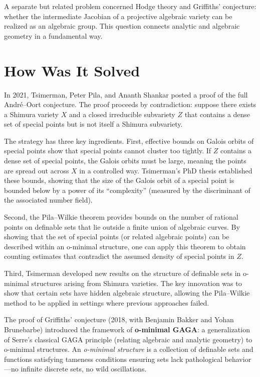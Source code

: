 A separate but related problem concerned Hodge theory and Griffiths' conjecture: whether the intermediate Jacobian of a projective algebraic variety can be realized as an algebraic group. This question connects analytic and algebraic geometry in a fundamental way.

\section{How Was It Solved}

In 2021, Tsimerman, Peter Pila, and Ananth Shankar posted a proof of the full Andr\'{e}--Oort conjecture. The proof proceeds by contradiction: suppose there exists a Shimura variety $X$ and a closed irreducible subvariety $Z$ that contains a dense set of special points but is not itself a Shimura subvariety.

The strategy has three key ingredients. First, effective bounds on Galois orbits of special points show that special points cannot cluster too tightly. If $Z$ contains a dense set of special points, the Galois orbits must be large, meaning the points are spread out across $X$ in a controlled way. Tsimerman's PhD thesis established these bounds, showing that the size of the Galois orbit of a special point is bounded below by a power of its ``complexity'' (measured by the discriminant of the associated number field).

Second, the Pila--Wilkie theorem provides bounds on the number of rational points on definable sets that lie outside a finite union of algebraic curves. By showing that the set of special points (or related algebraic points) can be described within an o-minimal structure, one can apply this theorem to obtain counting estimates that contradict the assumed density of special points in $Z$.

Third, Tsimerman developed new results on the structure of definable sets in o-minimal structures arising from Shimura varieties. The key innovation was to show that certain sets have hidden algebraic structure, allowing the Pila--Wilkie method to be applied in settings where previous approaches failed.

The proof of Griffiths' conjecture (2018, with Benjamin Bakker and Yohan Brunebarbe) introduced the framework of \textbf{o-minimal GAGA}: a generalization of Serre's classical GAGA principle (relating algebraic and analytic geometry) to o-minimal structures. An \emph{o-minimal structure} is a collection of definable sets and functions satisfying tameness conditions ensuring sets lack pathological behavior---no infinite discrete sets, no wild oscillations.

